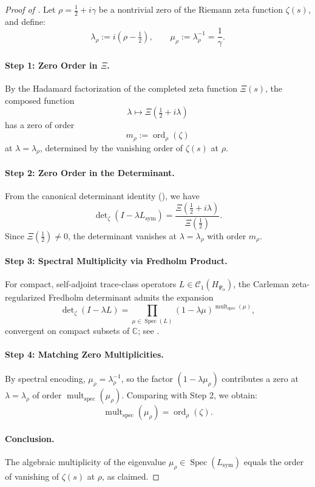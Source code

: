 \begin{proof}[Proof of ]
Let \( \rho = \tfrac{1}{2} + i\gamma \) be a nontrivial zero of the Riemann zeta function \( \zeta(s) \), and define:
\[
\lambda_\rho := i(\rho - \tfrac{1}{2}), \qquad \mu_\rho := \lambda_\rho^{-1} = \frac{1}{\gamma}.
\]

\paragraph{Step 1: Zero Order in \(\Xi\).}
By the Hadamard factorization of the completed zeta function \( \Xi(s) \), the composed function
\[
\lambda \mapsto \Xi\left( \tfrac{1}{2} + i\lambda \right)
\]
has a zero of order
\[
m_\rho := \operatorname{ord}_\rho(\zeta)
\]
at \( \lambda = \lambda_\rho \), determined by the vanishing order of \( \zeta(s) \) at \( \rho \).

\paragraph{Step 2: Zero Order in the Determinant.}
From the canonical determinant identity (), we have
\[
\det\nolimits_\zeta(I - \lambda L_{\mathrm{sym}}) = \frac{\Xi(\tfrac{1}{2} + i\lambda)}{\Xi(\tfrac{1}{2})}.
\]
Since \( \Xi(\tfrac{1}{2}) \neq 0 \), the determinant vanishes at \( \lambda = \lambda_\rho \) with order \( m_\rho \).

\paragraph{Step 3: Spectral Multiplicity via Fredholm Product.}
For compact, self-adjoint trace-class operators \( L \in \mathcal{C}_1(H_{\Psi_\alpha}) \), the Carleman zeta-regularized Fredholm determinant admits the expansion
\[
\det\nolimits_\zeta(I - \lambda L) = \prod_{\mu \in \operatorname{Spec}(L)} (1 - \lambda \mu)^{\operatorname{mult}_{\mathrm{spec}}(\mu)},
\]
convergent on compact subsets of \( \mathbb{C} \); see \cite[Thm.~4.2]{Simon2005TraceIdeals}.

\paragraph{Step 4: Matching Zero Multiplicities.}
By spectral encoding, \( \mu_\rho = \lambda_\rho^{-1} \), so the factor \( (1 - \lambda \mu_\rho) \) contributes a zero at \( \lambda = \lambda_\rho \) of order \( \operatorname{mult}_{\mathrm{spec}}(\mu_\rho) \). Comparing with Step 2, we obtain:
\[
\operatorname{mult}_{\mathrm{spec}}(\mu_\rho) = \operatorname{ord}_\rho(\zeta).
\]

\paragraph{Conclusion.}
The algebraic multiplicity of the eigenvalue \( \mu_\rho \in \operatorname{Spec}(L_{\mathrm{sym}}) \) equals the order of vanishing of \( \zeta(s) \) at \( \rho \), as claimed.
\end{proof}
